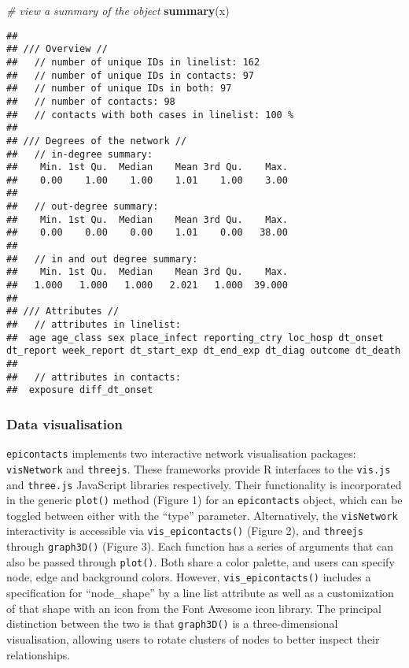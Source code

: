 \documentclass[9pt,a4paper,]{extarticle}
\newenvironment{Shaded}{\begin{snugshade}}{\end{snugshade}}
\newcommand{\KeywordTok}[1]{\textcolor[rgb]{0.13,0.29,0.53}{\textbf{#1}}}
\newcommand{\CommentTok}[1]{\textcolor[rgb]{0.56,0.35,0.01}{\textit{#1}}}
\newcommand{\NormalTok}[1]{#1}
\theoremstyle{definition}
\theoremstyle{definition}
\theoremstyle{definition}
\theoremstyle{remark}
\begin{document}
\begin{Shaded}
\begin{Highlighting}[]
\CommentTok{# view a summary of the object                  }
\KeywordTok{summary}\NormalTok{(x)}
\end{Highlighting}
\end{Shaded}

\begin{verbatim}
## 
## /// Overview //
##   // number of unique IDs in linelist: 162
##   // number of unique IDs in contacts: 97
##   // number of unique IDs in both: 97
##   // number of contacts: 98
##   // contacts with both cases in linelist: 100 %
## 
## /// Degrees of the network //
##   // in-degree summary:
##    Min. 1st Qu.  Median    Mean 3rd Qu.    Max. 
##    0.00    1.00    1.00    1.01    1.00    3.00 
## 
##   // out-degree summary:
##    Min. 1st Qu.  Median    Mean 3rd Qu.    Max. 
##    0.00    0.00    0.00    1.01    0.00   38.00 
## 
##   // in and out degree summary:
##    Min. 1st Qu.  Median    Mean 3rd Qu.    Max. 
##   1.000   1.000   1.000   2.021   1.000  39.000 
## 
## /// Attributes //
##   // attributes in linelist:
##  age age_class sex place_infect reporting_ctry loc_hosp dt_onset dt_report week_report dt_start_exp dt_end_exp dt_diag outcome dt_death
## 
##   // attributes in contacts:
##  exposure diff_dt_onset
\end{verbatim}

\subsubsection{Data visualisation}\label{data-visualisation}

\texttt{epicontacts} implements two interactive network visualisation packages: \texttt{visNetwork} and \texttt{threejs}\citep{visNetwork}\citep{threejs}. These frameworks provide R interfaces to the \texttt{vis.js} and \texttt{three.js} JavaScript libraries respectively. Their functionality is incorporated in the generic \texttt{plot()} method (Figure 1) for an \texttt{epicontacts} object, which can be toggled between either with the ``type'' parameter. Alternatively, the \texttt{visNetwork} interactivity is accessible via \texttt{vis\_epicontacts()} (Figure 2), and \texttt{threejs} through \texttt{graph3D()} (Figure 3). Each function has a series of arguments that can also be passed through \texttt{plot()}. Both share a color palette, and users can specify node, edge and background colors. However, \texttt{vis\_epicontacts()} includes a specification for ``node\_shape'' by a line list attribute as well as a customization of that shape with an icon from the Font Awesome icon library. The principal distinction between the two is that \texttt{graph3D()} is a three-dimensional visualisation, allowing users to rotate clusters of nodes to better inspect their relationships.
\end{document}
